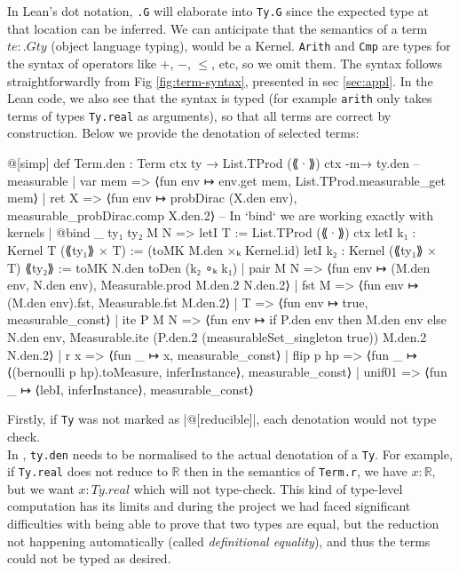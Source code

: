 In Lean's dot notation, \texttt{.G} will elaborate into \texttt{Ty.G} since the expected type at that location can be inferred.
We can anticipate that the semantics of a term $te : .G ty$ (object language typing), would be a Kernel.  %
\texttt{Arith} and \texttt{Cmp}
are types for the syntax of operators like $+$, $-$, $\leq$, etc, so we omit them. The syntax follows straightforwardly from Fig \ref{fig:term-syntax}, presented in sec \ref{sec:appl}.
In the Lean code, we also see that the syntax is typed (for example \texttt{arith} only takes terms of types \texttt{Ty.real} as arguments), so that all terms are correct by
construction. Below we provide the denotation of selected terms:

\begin{leancode}
@[simp] def Term.den : Term ctx ty → List.TProd (⟪·⟫) ctx -m→ ty.den -- measurable
  | var mem => ⟨fun env ↦ env.get mem, List.TProd.measurable_get mem⟩
  | ret X => ⟨fun env ↦ probDirac (X.den env), measurable_probDirac.comp X.den.2⟩
  -- In `bind` we are working exactly with kernels
  | @bind _ ty₁ ty₂ M N =>
    letI T := List.TProd (⟪·⟫) ctx
    letI k₁ : Kernel T (⟪ty₁⟫ × T) := (toMK M.den ×ₖ Kernel.id)
    letI k₂ : Kernel (⟪ty₁⟫ × T) ⟪ty₂⟫ := toMK N.den
    toDen (k₂ ∘ₖ k₁)
  | pair M N => ⟨fun env ↦ (M.den env, N.den env), Measurable.prod M.den.2 N.den.2⟩
  | fst M => ⟨fun env ↦ (M.den env).fst, Measurable.fst M.den.2⟩
  | T => ⟨fun env ↦ true, measurable_const⟩
  | ite P M N => ⟨fun env ↦ if P.den env then M.den env else N.den env,
      Measurable.ite (P.den.2 (measurableSet_singleton true)) M.den.2 N.den.2⟩
  | r x => ⟨fun _ ↦ x, measurable_const⟩
  | flip p hp => ⟨fun _ ↦ ⟨(bernoulli p hp).toMeasure, inferInstance⟩, measurable_const⟩
  | unif01 => ⟨fun _ ↦ ⟨lebI, inferInstance⟩, measurable_const⟩
\end{leancode}

Firstly, if \texttt{Ty} was not marked as \lean|@[reducible]|, each denotation would not type check.\\ In ,
\texttt{ty.den} needs to be normalised to the actual denotation of a \texttt{Ty}. For example, if \texttt{Ty.real} does not reduce to $\mathbb{R}$
then in the semantics of \texttt{Term.r}, we have $x : \mathbb{R}$, but we want $x : Ty.real$ which will not type-check. This kind of type-level
computation has its limits and during the project we had faced significant difficulties with being able to prove that two types are equal, but the 
reduction not happening automatically (called \emph{definitional equality}), and thus the terms could not be typed as desired.

